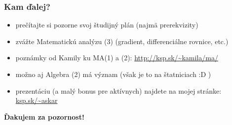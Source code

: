 \documentclass{beamer}
\begin{document}
\begin{frame}
\frametitle{Kam ďalej?}
\begin{itemize}
\item prečítajte si pozorne svoj študijný plán (najmä prerekvizity)
\pause
\item zvážte Matematickú analýzu (3) (gradient, differenciálne rovnice, etc.)
\pause
\item poznámky od Kamily ku MA(1) a (2): \url{http://ksp.sk/~kamila/ma/}
\pause 
\item možno aj Algebra (2) má význam \pause (však je to na štatniciach :D )
\pause
\item prezentáciu (a malý bonus pre aktívnych) najdete na mojej stránke: \url{ksp.sk/~askar}
\end{itemize}
\pause 

\begin{LARGE}
\begin{center}
\textbf{Ďakujem za pozornost!}

\end{center}
\end{LARGE}

\end{frame}
\end{document}
